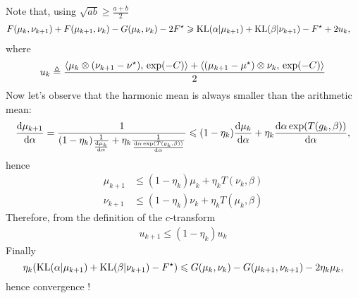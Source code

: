 \documentclass[a4paper, 10pt]{article}
\begin{document}
Note that, using $\sqrt{ab} \geq \frac{a + b}{2}$ 
\begin{align}
    F(\mu_k,\nu_{k+1}) + F(\mu_{k+1},\nu_k) - G(\mu_k, \nu_k) - 2 F^\star
    &\geqslant \text{KL}(\alpha|\mu_{k+1}) + \text{KL}(\beta|\nu_{k+1}) - F^\star
        + 2 u_k,
\end{align}
where 
\begin{align}
    u_k &\triangleq
    \frac{
        \langle \mu_k \otimes (\nu_{k+1} - \nu^\star),\,\exp(-C)\rangle
        + \langle (\mu_{k+1} - \mu^\star)\otimes \nu_k,\,\exp(-C)\rangle
        }{2} \\
\end{align}
Now let's observe that the harmonic mean is always smaller than the arithmetic mean:
\begin{equation}
    \frac{\textrm{d} \mu_{k+1}}{\textrm{d} \alpha}
     = \frac{1}{(1- \eta_k) \frac{1}{\frac{\textrm{d} \mu_{k}}{\textrm{d} \alpha}}
     + \eta_k \frac{1}{\frac{\textrm{d} \alpha \exp(T(g_k, \beta))}{\textrm{d} \alpha}}}
     \leqslant (1-\eta_k) \frac{\textrm{d} \mu_{k}}{\textrm{d} \alpha}
     + \eta_k \frac{\textrm{d} \alpha \exp(T(g_k, \beta))}{\textrm{d} \alpha},
\end{equation}
hence
\begin{align}
    \mu_{k+1} &\leq (1 -\eta_k) \mu_k + \eta_k T(\nu_k, \beta) \\
    \nu_{k+1} &\leq (1 -\eta_k) \nu_k + \eta_k T(\mu_k, \beta)
\end{align}
Therefore, from the definition of the $c$-transform
\begin{align}
    u_{k+1} \leq (1 - \eta_k) u_k
\end{align}
Finally
\begin{equation}
    \eta_k (\text{KL}(\alpha|\mu_{k+1}) + \text{KL}(\beta|\nu_{k+1}) - F^\star) \leqslant 
    G(\mu_k, \nu_k) - G(\mu_{k+1},\nu_{k+1}) - 2 \eta_k \mu_k,
\end{equation}
hence convergence !
\end{document}
